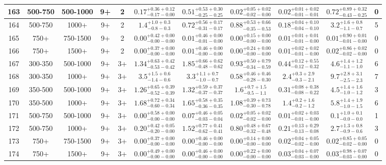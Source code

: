 \documentclass[11pt, oneside]{article}
\begin{document}
\begin{table}
{\begin{tabular}{ |c|c|c|c|c||c|c|c|c||c|c| }
163 & 500-750 & 500-1000 & 9+ & 2 & $0.17^{+0.36+0.12}_{-0.17-0.00}$ & $0.51^{+0.53+0.30}_{-0.25-0.25}$ & $0.02^{+0.05+0.02}_{-0.02-0.00}$ & $0.02^{+0.01+0.02}_{-0.01-0.01}$ & $0.72^{+0.89+0.32}_{-0.43-0.25}$ & 0 \\ \hline
164 & 500-750 & 1000+ & 9+ & 2 & $1.4^{+1.0+0.3}_{-0.8-0.3}$ & $0.72^{+0.56+0.17}_{-0.31-0.17}$ & $0.88^{+0.53+0.66}_{-0.35-0.53}$ & $0.18^{+0.04+0.10}_{-0.04-0.10}$ & $3.2^{+1.6+0.8}_{-1.1-0.7}$ & 5 \\ \hline
165 & 750+ & 750-1500 & 9+ & 2 & $0.00^{+0.42+0.00}_{-0.00-0.00}$ & $0.01^{+0.46+0.00}_{-0.01-0.00}$ & $0.00^{+0.15+0.00}_{-0.00-0.00}$ & $0.01^{+0.01+0.01}_{-0.01-0.00}$ & $0.01^{+0.90+0.01}_{-0.01-0.00}$ & 0 \\ \hline
166 & 750+ & 1500+ & 9+ & 2 & $0.00^{+0.37+0.00}_{-0.00-0.00}$ & $0.01^{+0.46+0.00}_{-0.00-0.00}$ & $0.00^{+0.24+0.00}_{-0.00-0.00}$ & $0.01^{+0.02+0.02}_{-0.01-0.00}$ & $0.02^{+0.86+0.02}_{-0.02-0.00}$ & 0 \\ \hline
167 & 300-350 & 500-1000 & 9+ & 3+ & $1.34^{+0.63+0.42}_{-0.53-0.42}$ & $1.85^{+0.66+0.62}_{-0.48-0.62}$ & $0.93^{+0.50+0.79}_{-0.34-0.59}$ & $0.44^{+0.12+0.55}_{-0.12-0.32}$ & $4.6^{+1.4+1.2}_{-1.1-1.0}$ & 6 \\ \hline
168 & 300-350 & 1000+ & 9+ & 3+ & $3.5^{+1.5+0.6}_{-1.4-0.6}$ & $3.3^{+1.1+0.7}_{-1.0-0.7}$ & $0.58^{+0.46+0.46}_{-0.28-0.30}$ & $2.4^{+0.3+2.9}_{-0.3-2.1}$ & $9.7^{+2.8+3.1}_{-2.5-2.3}$ & 7 \\ \hline
169 & 350-500 & 500-1000 & 9+ & 3+ & $1.26^{+0.65+0.39}_{-0.52-0.39}$ & $1.32^{+0.59+0.37}_{-0.37-0.37}$ & $1.6^{+0.7+1.5}_{-0.5-1.1}$ & $0.31^{+0.08+0.38}_{-0.08-0.22}$ & $4.5^{+1.4+1.6}_{-1.0-1.2}$ & 3 \\ \hline
170 & 350-500 & 1000+ & 9+ & 3+ & $1.68^{+0.72+0.34}_{-0.60-0.34}$ & $1.65^{+0.58+0.35}_{-0.36-0.35}$ & $1.08^{+0.39+0.73}_{-0.30-0.78}$ & $1.4^{+0.2+1.6}_{-0.2-1.2}$ & $5.8^{+1.4+1.9}_{-1.0-1.5}$ & 6 \\ \hline
171 & 500-750 & 500-1000 & 9+ & 3+ & $0.00^{+0.58+0.00}_{-0.00-0.00}$ & $0.07^{+0.46+0.05}_{-0.03-0.04}$ & $0.02^{+0.05+0.02}_{-0.02-0.00}$ & $0.01^{+0.02+0.03}_{-0.01-0.00}$ & $0.1^{+1.0+0.1}_{-0.0-0.0}$ & 1 \\ \hline
172 & 500-750 & 1000+ & 9+ & 3+ & $0.20^{+0.42+0.05}_{-0.20-0.00}$ & $1.52^{+0.77+0.41}_{-0.62-0.41}$ & $0.80^{+0.48+0.67}_{-0.32-0.48}$ & $0.21^{+0.13+0.29}_{-0.13-0.08}$ & $2.7^{+1.3+0.8}_{-0.9-0.6}$ & 3 \\ \hline
173 & 750+ & 750-1500 & 9+ & 3+ & $0.00^{+0.37+0.00}_{-0.00-0.00}$ & $0.00^{+0.46+0.00}_{-0.00-0.00}$ & $0.00^{+0.14+0.00}_{-0.00-0.00}$ & $0.02^{+0.04+0.05}_{-0.02-0.00}$ & $0.02^{+0.85+0.05}_{-0.02-0.00}$ & 0 \\ \hline
174 & 750+ & 1500+ & 9+ & 3+ & $0.00^{+0.49+0.00}_{-0.00-0.00}$ & $0.00^{+0.46+0.00}_{-0.00-0.00}$ & $0.00^{+0.22+0.00}_{-0.00-0.00}$ & $0.03^{+0.04+0.07}_{-0.03-0.00}$ & $0.03^{+0.98+0.07}_{-0.03-0.00}$ & 0 \\ \hline
\end{tabular}}
\end{table}
\end{document}
